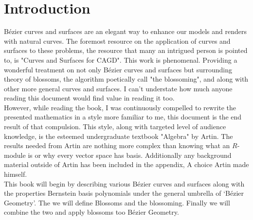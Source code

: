 
\section{Introduction}
Bézier curves and surfaces are an elegant way to enhance our models and renders with natural curves.
The foremost resource on the application of curves and surfaces to these problems,
the resource that many an intrigued person is pointed to,
is "Curves and Surfaces for CAGD"\cite{CAGD}.
This work is phenomenal.
Providing a wonderful treatment on not only Bézier curves and surfaces but surrounding theory of blossoms,
the algorithm poetically call "the blossoming",
and along with other more general curves and surfaces.
I can't understate how much anyone reading this document would find value in reading it too.
\\

However,
while reading the book,
I was continuously compelled to rewrite the presented mathematics in a style more familiar to me,
this document is the end result of that compulsion.
This style,
along with targeted level of audience knowledge,
is the esteemed undergraduate textbook "Algebra" by Artin\cite{artin}.
The results needed from Artin are nothing more complex than knowing what an $R$-module is or why every vector space has basis.
Additionally any background material outside of Artin has been included in the appendix,
A choice Artin made himself.
\\

This book will begin by describing various Bézier curves and surfaces along with the properties Bernstein basis polynomials
under the general umbrella of `Bézier Geometry'.
The we will define Blossoms and the blossoming.
Finally we will combine the two and apply blossoms too Bézier Geometry.
